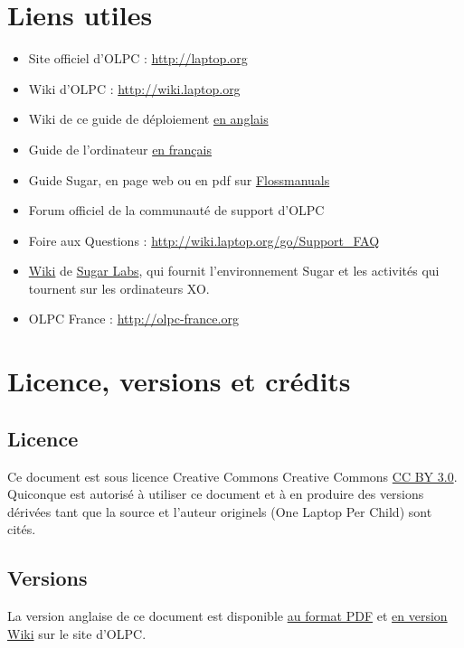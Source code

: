 \documentclass[12pt]{article}
\begin{document}
\section{Liens utiles}
\label{sec-12}


\begin{itemize}
\item Site officiel d'OLPC : \href{http://laptop.org}{http://laptop.org}
\item Wiki d'OLPC : \href{http://wiki.laptop.org}{http://wiki.laptop.org}
\item Wiki de ce guide de déploiement \href{http://wiki.laptop.org/go/Deployment_Guide}{en anglais}
\item Guide de l'ordinateur \href{http://olpc-france.org/docs/OLPC%2520Guide%2520de%2520l'ordinateur.pdf}{en français}
\item Guide Sugar, en page web ou en pdf sur \href{http://en.flossmanuals.net/Sugar}{Flossmanuals}
\item Forum officiel de la communauté de support d'OLPC
\item Foire aux Questions : \href{http://wiki.laptop.org/go/Support_FAQ}{http://wiki.laptop.org/go/Support\_FAQ}
\item \href{http://wiki.sugarlabs.org/}{Wiki} de \href{http://sugarlabs.org/}{Sugar Labs}, qui fournit l'environnement Sugar et les activités
  qui tournent sur les ordinateurs XO.
\item OLPC France : \href{http://olpc-france.org}{http://olpc-france.org}
\end{itemize}
\section{Licence, versions et crédits}
\label{sec-13}
\subsection{Licence}
\label{sec-13-1}


Ce document est sous licence Creative Commons Creative Commons \href{http://creativecommons.org/licenses/by/3.0/}{CC BY 3.0}.  Quiconque est autorisé à utiliser ce document et à en produire des
versions dérivées tant que la source et l'auteur originels (One Laptop Per
Child) sont cités.
\subsection{Versions}
\label{sec-13-2}


La version anglaise de ce document est disponible \href{http://wiki.laptop.org/images/1/1c/OLPC_Deployment_Guide_2011.pdf}{au format PDF} et \href{http://wiki.laptop.org/go/Deployment_Guide_2011}{en version Wiki} sur le site d'OLPC.
\end{document}
